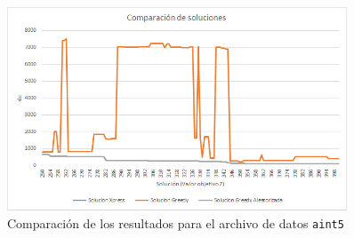 \documentclass[a4paper,11pt]{article}
\begin{document}
\begin{figure}[!htbp]
	\centering
	\includegraphics[width=0.9\textwidth]{6_2_aint5_comparacion.png}
    \caption{Comparación de los resultados para el archivo de datos \texttt{aint5}}
\end{figure}
\end{document}
